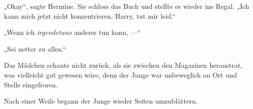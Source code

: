 „Okay“, sagte Hermine. Sie schloss das Buch und stellte es wieder ins Regal.
„Ich kann mich jetzt nicht konzentrieren, Harry, tut mir leid.“

„Wenn ich \emph{irgendetwas} anderes tun kann, —“

„Sei netter zu allen.“

Das Mädchen schaute nicht zurück, als sie zwischen den Magazinen heraustrat, was vielleicht gut gewesen wäre, denn der Junge war unbeweglich an Ort und Stelle eingefroren.

Nach einer Weile begann der Junge wieder Seiten umzublättern.

